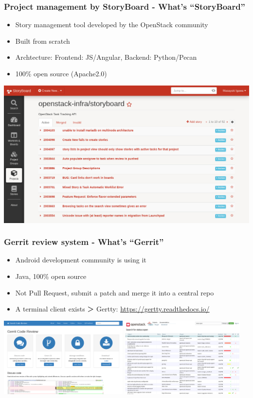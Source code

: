 \documentclass[aspectratio=169,11pt,hyperref={colorlinks=true}]{beamer}
\begin{document}
\begin{frame}
  \frametitle{Project management by StoryBoard - What's ``StoryBoard''}
  \begin{itemize}
    \item Story management tool developed by the OpenStack community
    \item Built from scratch
    \item Archtecture: {Frontend: JS/Angular, Backend: Python/Pecan}
    \item 100\% open source (Apache2.0)
  \end{itemize}
  \centering\includegraphics[scale=0.2]{images/storyboard.png}
\end{frame}

\begin{frame}
  \frametitle{Gerrit review system - What's ``Gerrit''}
  \begin{itemize}
    \item Android development community is using it
    \item Java, 100\% open source
    \item Not Pull Request, submit a patch and merge it into a central repo
    \item A terminal client exists ＞ Gertty: \url{https://gertty.readthedocs.io/}
  \end{itemize}
  \centering
  \includegraphics[height=40mm]{images/gerritcodereview-com.png}
  \includegraphics[height=40mm]{images/review-openstack-org.png}
\end{frame}
\end{document}
